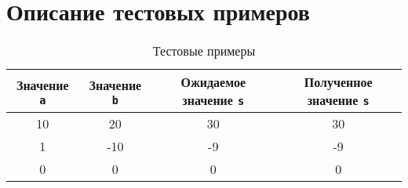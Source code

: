 \section{Описание тестовых примеров}

\begin{table}[H]
  \centering
  \begin{tabular}{|| c | c | c | c ||}
    \hline
    Значение \texttt{a} & Значение \texttt{b} & Ожидаемое значение \texttt{s} & Полученное значение \texttt{s} \\
    \hline\hline
    10 & 20 & 30 & 30 \\
    \hline
    1 & -10 & -9 & -9 \\
    \hline
    0 & 0 & 0 & 0 \\
    \hline
  \end{tabular}
  \caption{Тестовые примеры}
\end{table}

 
